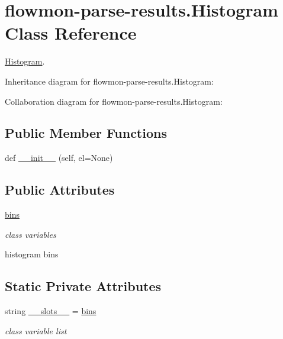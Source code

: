 \hypertarget{classflowmon-parse-results_1_1Histogram}{}\section{flowmon-\/parse-\/results.Histogram Class Reference}
\label{classflowmon-parse-results_1_1Histogram}


\hyperlink{classflowmon-parse-results_1_1Histogram}{Histogram}.  




Inheritance diagram for flowmon-\/parse-\/results.Histogram\+:


Collaboration diagram for flowmon-\/parse-\/results.Histogram\+:
\subsection*{Public Member Functions}
\begin{DoxyCompactItemize}
\item 
def \hyperlink{classflowmon-parse-results_1_1Histogram_aa67fd866cfed23689f066b51cfa16126}{\+\_\+\+\_\+init\+\_\+\+\_\+} (self, el=None)
\end{DoxyCompactItemize}
\subsection*{Public Attributes}
\begin{DoxyCompactItemize}
\item 
\hyperlink{classflowmon-parse-results_1_1Histogram_af01bbd23926e4fa0ba1fe7933d695f62}{bins}
\begin{DoxyCompactList}\small\item\em class variables

histogram bins \end{DoxyCompactList}\end{DoxyCompactItemize}
\subsection*{Static Private Attributes}
\begin{DoxyCompactItemize}
\item 
string \hyperlink{classflowmon-parse-results_1_1Histogram_af8bb5ae68154881ec7cc3253a5597588}{\+\_\+\+\_\+slots\+\_\+\+\_\+} = \textquotesingle{}\hyperlink{classflowmon-parse-results_1_1Histogram_af01bbd23926e4fa0ba1fe7933d695f62}{bins}\textquotesingle{}
\begin{DoxyCompactList}\small\item\em class variable list \end{DoxyCompactList}\end{DoxyCompactItemize}


